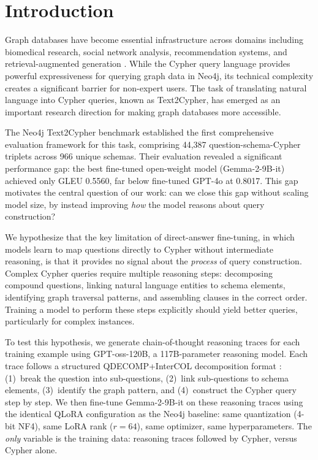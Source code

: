\documentclass[11pt]{article}
\begin{document}
\section{Introduction}

Graph databases have become essential infrastructure across domains including biomedical research, social network analysis, recommendation systems, and retrieval-augmented generation \citep{timon2021overview, xu2024rag}. While the Cypher query language provides powerful expressiveness for querying graph data in Neo4j, its technical complexity creates a significant barrier for non-expert users. The task of translating natural language into Cypher queries, known as Text2Cypher, has emerged as an important research direction for making graph databases more accessible.

The Neo4j Text2Cypher benchmark \citep{ozsoy2025text2cypher} established the first comprehensive evaluation framework for this task, comprising 44,387 question-schema-Cypher triplets across 966 unique schemas. Their evaluation revealed a significant performance gap: the best fine-tuned open-weight model (Gemma-2-9B-it) achieved only GLEU 0.5560, far below fine-tuned GPT-4o at 0.8017. This gap motivates the central question of our work: can we close this gap without scaling model size, by instead improving \emph{how} the model reasons about query construction?

We hypothesize that the key limitation of direct-answer fine-tuning, in which models learn to map questions directly to Cypher without intermediate reasoning, is that it provides no signal about the \emph{process} of query construction. Complex Cypher queries require multiple reasoning steps: decomposing compound questions, linking natural language entities to schema elements, identifying graph traversal patterns, and assembling clauses in the correct order. Training a model to perform these steps explicitly should yield better queries, particularly for complex instances.

To test this hypothesis, we generate chain-of-thought reasoning traces for each training example using GPT-oss-120B, a 117B-parameter reasoning model. Each trace follows a structured QDECOMP+InterCOL decomposition format \citep{tai2023cot}: (1)~break the question into sub-questions, (2)~link sub-questions to schema elements, (3)~identify the graph pattern, and (4)~construct the Cypher query step by step. We then fine-tune Gemma-2-9B-it on these reasoning traces using the identical QLoRA configuration as the Neo4j baseline: same quantization (4-bit NF4), same LoRA rank ($r{=}64$), same optimizer, same hyperparameters. The \emph{only} variable is the training data: reasoning traces followed by Cypher, versus Cypher alone.
\end{document}
